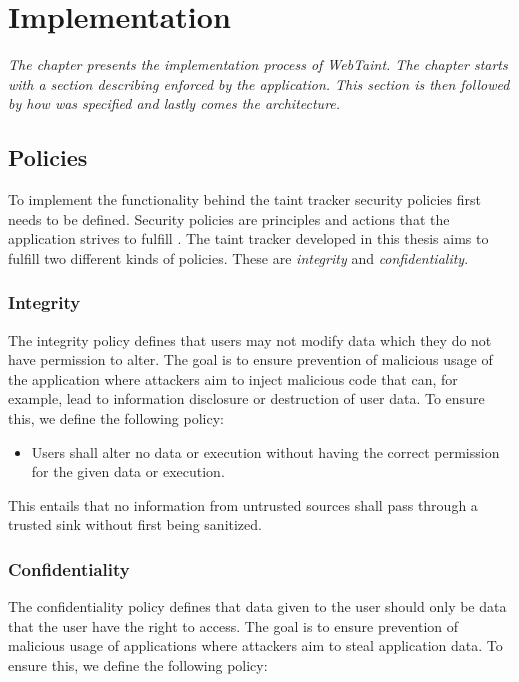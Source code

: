 \chapter{Implementation}
\label{Implementation}
\textit{The chapter presents the implementation process of WebTaint. The chapter starts with a section describing \textit{} enforced by the application. This section is then followed by how \textit{} was specified and lastly comes the \textit{} architecture.}



\section{Policies}
\label{Policies}
To implement the functionality behind the taint tracker security policies first needs to be defined. Security policies are principles and actions that the application strives to fulfill \parencite{BayukJenniferL2012Cspg}. The taint tracker developed in this thesis aims to fulfill two different kinds of policies. These are \textit{integrity} and \textit{confidentiality}.



\subsection{Integrity}
\label{Integrity}
The integrity policy defines that users may not modify data which they do not have permission to alter. The goal is to ensure prevention of malicious usage of the application where attackers aim to inject malicious code that can, for example, lead to information disclosure or destruction of user data. To ensure this, we define the following policy:

\hfill
\begin{itemize}
    \item Users shall alter no data or execution without having the correct permission for the given data or execution.
\end{itemize}
\hfill

This entails that no information from untrusted sources shall pass through a trusted sink without first being sanitized.



\subsection{Confidentiality}
\label{Confidentiality}
The confidentiality policy defines that data given to the user should only be data that the user have the right to access. The goal is to ensure prevention of malicious usage of applications where attackers aim to steal application data. To ensure this, we define the following policy:

